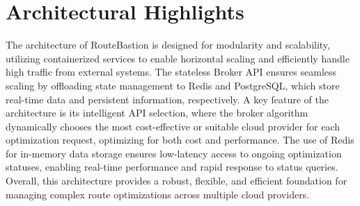 \documentclass[english,notblind]{sbc20}
\begin{document}
\section{Architectural Highlights}
\label{sec:architectural_highlights}
The architecture of RouteBastion is designed for modularity and scalability, utilizing containerized services to enable horizontal scaling and efficiently handle high traffic from external systems. The stateless Broker API ensures seamless scaling by offloading state management to Redis and PostgreSQL, which store real-time data and persistent information, respectively. A key feature of the architecture is its intelligent API selection, where the broker algorithm dynamically chooses the most cost-effective or suitable cloud provider for each optimization request, optimizing for both cost and performance. The use of Redis for in-memory data storage ensures low-latency access to ongoing optimization statuses, enabling real-time performance and rapid response to status queries. Overall, this architecture provides a robust, flexible, and efficient foundation for managing complex route optimizations across multiple cloud providers.




\end{document}

